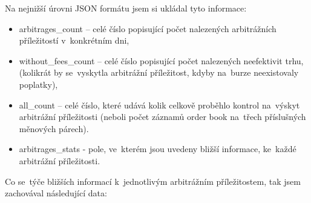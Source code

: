 \documentclass[thesis=B,czech]{FITthesis}[2019/03/21]
\begin{document}
Na nejnižší úrovni JSON formátu jsem si ukládal tyto informace:
\begin{itemize}
    \item arbitrages\_count -- celé číslo popisující počet nalezených arbitrážních příležitostí v~konkrétním dni,
    \item without\_fees\_count -- celé číslo popisující počet nalezených neefektivit trhu, (kolikrát by se~vyskytla arbitrážní příležitost, kdyby na~burze neexistovaly poplatky), 
    \item all\_count -- celé číslo, které udává kolik celkově proběhlo kontrol na~výskyt arbitrážní příležitosti (neboli počet záznamů order book na~třech \linebreak příslušných měnových párech).
    \item arbitrages\_stats - pole, ve~kterém jsou uvedeny bližší informace, ke~každé arbitrážní příležitosti. 
\end{itemize}
Co se~týče bližších informací k~jednotlivým arbitrážním příležitostem, tak jsem zachovával následující data:
\end{document}
